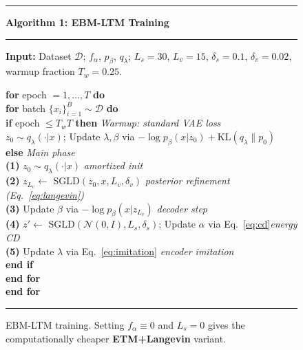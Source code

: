 \documentclass[10pt]{article}
\newcommand{\KL}{\mathrm{KL}}
\begin{document}
\begin{figure}[t]
\centering
\begin{minipage}{0.9\textwidth}
\noindent\rule{\textwidth}{0.5pt}\smallskip

\noindent\textbf{Algorithm 1: EBM-LTM Training}

\noindent\rule{\textwidth}{0.3pt}\smallskip

\noindent\textbf{Input:} Dataset $\mathcal{D}$; $f_\alpha$, $p_\beta$, $q_\lambda$;
$L_s{=}30$, $L_v{=}15$, $\delta_s{=}0.1$, $\delta_v{=}0.02$, warmup fraction $T_w{=}0.25$.

\smallskip\noindent\textbf{for} epoch $= 1, \ldots, T$ \textbf{do}\\
\hspace*{1.2em}\textbf{for} batch $\{x_i\}_{i=1}^B \sim \mathcal{D}$ \textbf{do}\\
\hspace*{2.4em}\textbf{if} epoch $\le T_w T$ \textbf{then} \hfill\textit{Warmup: standard VAE loss}\\
\hspace*{3.6em}$z_0 \sim q_\lambda(\cdot|x)$; \; Update $\lambda,\beta$ via $-\log p_\beta(x|z_0) + \KL(q_\lambda\|p_0)$\\
\hspace*{2.4em}\textbf{else} \hfill\textit{Main phase}\\
\hspace*{3.6em}\textbf{(1)} $z_0 \sim q_\lambda(\cdot|x)$ \hfill\textit{amortized init}\\
\hspace*{3.6em}\textbf{(2)} $z_{L_v} \leftarrow$ SGLD$(z_0, x, L_v, \delta_v)$ \hfill\textit{posterior refinement (Eq.~\ref{eq:langevin})}\\
\hspace*{3.6em}\textbf{(3)} Update $\beta$ via $-\log p_\beta(x|z_{L_v})$ \hfill\textit{decoder step}\\
\hspace*{3.6em}\textbf{(4)} $z'\!\leftarrow$ SGLD$(\mathcal{N}(0,I), L_s, \delta_s)$; Update $\alpha$ via Eq.~\eqref{eq:cd}\hfill\textit{energy CD}\\
\hspace*{3.6em}\textbf{(5)} Update $\lambda$ via Eq.~\eqref{eq:imitation} \hfill\textit{encoder imitation}\\
\hspace*{2.4em}\textbf{end if}\\
\hspace*{1.2em}\textbf{end for}\\
\noindent\textbf{end for}

\smallskip\noindent\rule{\textwidth}{0.5pt}
\end{minipage}
\caption{EBM-LTM training. Setting $f_\alpha\equiv 0$ and $L_s=0$ gives the
computationally cheaper \textbf{ETM+Langevin} variant.}
\label{alg:training}
\end{figure}
\end{document}
